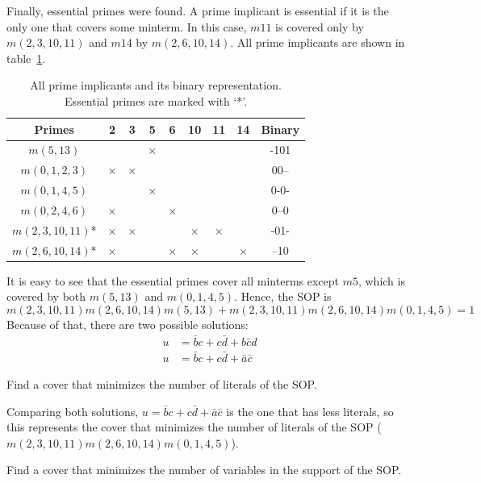 \documentclass[a4paper, 10pt]{article}
\begin{document}
Finally, essential primes were found. A prime implicant is essential if it is the only one that covers some minterm. In this case, $m11$ is covered only by $m(2,3,10,11)$ and $m14$ by $m(2,6,10,14)$. All prime implicants are shown in table~\ref{tab:essential}.

\begin{table}[hbtp]
    \centering
    \begin{tabular}{|c | c c c c c c c | c |}
        \hline
        Primes          & 2 & 3 & 5 & 6 & 10 & 11 & 14 & Binary \\ \hline
        $m(5,13)$         &   &   & $\times$ &   &    &    &    & -101\\     
        $m(0,1,2,3)  $    & $\times$ & $\times$ &   &   &    &    &    & 00--\\   
        $m(0,1,4,5)  $    &   &   & $\times$ &   &    &    &    & 0-0-\\          
        $m(0,2,4,6)  $    & $\times$ &   &   & $\times$ &    &    &    & 0--0\\       
        $m(2,3,10,11)$*   & $\times$ & $\times$ &   &   &  $\times$ &  $\times$ &    & -01-\\       
        $m(2,6,10,14)$*   & $\times$ &   &   & $\times$ &  $\times$ &    &  $\times$ & --10\\   \hline
    \end{tabular}
    \caption{All prime implicants and its binary representation. Essential primes are marked with `*'.}
    \label{tab:essential}
\end{table}

It is easy to see that the essential primes cover all minterms except $m5$, which is covered by both $m(5,13)$ and $m(0,1,4,5)$. Hence, the SOP is 
\[m(2,3,10,11)m(2,6,10,14)m(5,13) + m(2,3,10,11)m(2,6,10,14)m(0,1,4,5) = 1\] 
Because of that, there are two possible solutions:
\begin{align*}
    u &= \bar{b}c + c\bar{d} + b\bar{c}d \\
    u &= \bar{b}c + c\bar{d} + \bar{a}\bar{c}
\end{align*}

{\color{statement} Find a cover that minimizes the number of literals of the SOP.}

Comparing both solutions, $u = \bar{b}c + c\bar{d} + \bar{a}\bar{c}$ is the one that has less literals, so this represents the cover that minimizes the number of literals of the SOP ($m(2,3,10,11)m(2,6,10,14)m(0,1,4,5)$).

{\color{statement} Find a cover that minimizes the number of variables in the support of the SOP.}
\end{document}

